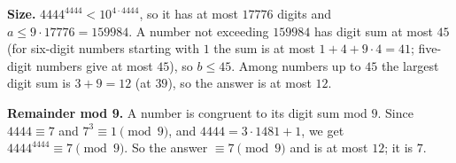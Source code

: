 \textbf{Size.} $4444^{4444}<10^{4\cdot4444}$, so it has at most $17776$ digits and $a\le9\cdot17776=159984$. A number not exceeding $159984$ has digit sum at most $45$ (for six-digit numbers starting with $1$ the sum is at most $1+4+9\cdot4=41$; five-digit numbers give at most $45$), so $b\le45$. Among numbers up to $45$ the largest digit sum is $3+9=12$ (at $39$), so the answer is at most $12$.

\textbf{Remainder mod 9.} A number is congruent to its digit sum mod $9$. Since $4444\equiv7$ and $7^3\equiv1\pmod9$, and $4444=3\cdot1481+1$, we get $4444^{4444}\equiv7\pmod9$. So the answer $\equiv7\pmod9$ and is at most $12$; it is $\boxed{7}$.
